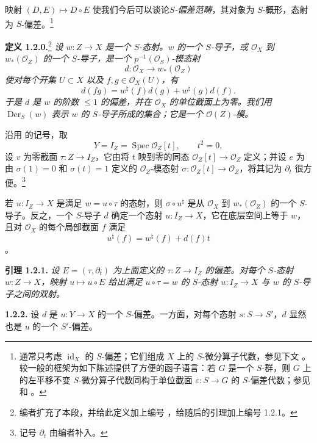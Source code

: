 映射 \((D,E)\mapsto D\circ E\) 使我们今后可以谈论\emph{\(S\)-偏差范畴}，其对象为 \(S\)-概形，态射为 \(S\)-偏差。\footnote{通常只考虑 \(\operatorname{id}_X\) 的 \(S\)-偏差；它们组成 \(X\) 上的 \(S\)-微分算子代数，参见下文 。较一般的框架为如下陈述提供了方便的函子语言：若 \(G\) 是一个 \(S\)-群，则 \(G\) 上的左平移不变 \(S\)-微分算子代数同构于单位截面 \(\varepsilon:S\to G\) 的 \(S\)-偏差代数；参见  和 。}

\medskip
\noindent\textbf{定义 1.2.0.}\footnote{编者扩充了本段，并给此定义加上编号 ，给随后的引理加上编号 1.2.1。}
\label{sga3:VIIA:1.2.0}
\textit{设 \(w:Z\to X\) 是一个 \(S\)-态射。\(w\) 的一个 \(S\)-导子，或 \(\mathcal O_X\) 到 \(w_*(\mathcal O_Z)\) 的一个 \(S\)-导子，是一个 \(p^{-1}(\mathcal O_S)\)-模态射
\[
  d:\mathcal O_X\longrightarrow w_*(\mathcal O_Z)
\]
使对每个开集 \(U\subset X\) 以及 \(f,g\in\mathcal O_X(U)\)，有
\[
  d(fg)=w^\natural(f)d(g)+w^\natural(g)d(f).
\]
于是 \(d\) 是 \(w\) 的阶数 \(\leq1\) 的偏差，并在 \(\mathcal O_X\) 的单位截面上为零。我们用 \(\operatorname{Der}_S(w)\) 表示 \(w\) 的 \(S\)-导子所成的集合；它是一个 \(\mathcal O(Z)\)-模。}

沿用  的记号，取
\[
  Y=I_Z=\operatorname{Spec}\mathcal O_Z[t],\qquad t^2=0,
\]
设 \(v\) 为零截面 \(\tau:Z\to I_Z\)，它由将 \(t\) 映到零的同态 \(\mathcal O_Z[t]\to\mathcal O_Z\) 定义；并设 \(e\) 为由 \(\sigma(1)=0\) 和 \(\sigma(t)=1\) 定义的 \(\mathcal O_Z\)-模态射 \(\sigma:\mathcal O_Z[t]\to\mathcal O_Z\)，将其记为 \(\partial_t\) 很方便。\footnote{记号 \(\partial_t\) 由编者补入。}

若 \(u:I_Z\to X\) 是满足 \(w=u\circ\tau\) 的态射，则 \(\sigma\circ u^\natural\) 是从 \(\mathcal O_X\) 到 \(w_*(\mathcal O_Z)\) 的一个 \(S\)-导子。反之，一个 \(S\)-导子 \(d\) 确定一个态射 \(u:I_Z\to X\)，它在底层空间上等于 \(w\)，且对 \(\mathcal O_X\) 的每个局部截面 \(f\) 满足
\[
  u^\natural(f)=w^\natural(f)+d(f)t
\]
。

\medskip
\noindent\textbf{引理 1.2.1.}
\label{sga3:VIIA:1.2.1}
\textit{设 \(E=(\tau,\partial_t)\) 为上面定义的 \(\tau:Z\to I_Z\) 的偏差。对每个 \(S\)-态射 \(w:Z\to X\)，映射 \(u\mapsto u\circ E\) 给出满足 \(u\circ\tau=w\) 的 \(S\)-态射 \(u:I_Z\to X\) 与 \(w\) 的 \(S\)-导子之间的双射。}

\medskip
\noindent\textbf{1.2.2.}
\label{sga3:VIIA:1.2.2}
设 \(d\) 是 \(u:Y\to X\) 的一个 \(S\)-偏差。一方面，对每个态射 \(s:S\to S'\)，\(d\) 显然也是 \(u\) 的一个 \(S'\)-偏差。

